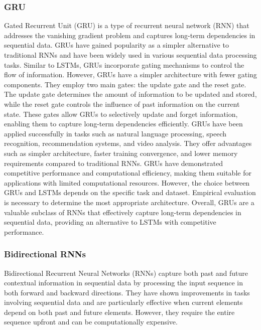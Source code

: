 \subsubsection{GRU}
Gated Recurrent Unit (GRU) is a type of recurrent neural network (RNN) that addresses the vanishing gradient problem and captures long-term dependencies in sequential data. GRUs have gained popularity as a simpler alternative to traditional RNNs and have been widely used in various sequential data processing tasks.
Similar to LSTMs, GRUs incorporate gating mechanisms to control the flow of information. However, GRUs have a simpler architecture with fewer gating components. They employ two main gates: the update gate and the reset gate. The update gate determines the amount of information to be updated and stored, while the reset gate controls the influence of past information on the current state. These gates allow GRUs to selectively update and forget information, enabling them to capture long-term dependencies efficiently.
GRUs have been applied successfully in tasks such as natural language processing, speech recognition, recommendation systems, and video analysis. They offer advantages such as simpler architecture, faster training convergence, and lower memory requirements compared to traditional RNNs. GRUs have demonstrated competitive performance and computational efficiency, making them suitable for applications with limited computational resources.
However, the choice between GRUs and LSTMs depends on the specific task and dataset. Empirical evaluation is necessary to determine the most appropriate architecture. Overall, GRUs are a valuable subclass of RNNs that effectively capture long-term dependencies in sequential data, providing an alternative to LSTMs with competitive performance.
\subsubsection{Bidirectional RNNs}
Bidirectional Recurrent Neural Networks (RNNs) capture both past and future contextual information in sequential data by processing the input sequence in both forward and backward directions. They have shown improvements in tasks involving sequential data and are particularly effective when current elements depend on both past and future elements. However, they require the entire sequence upfront and can be computationally expensive.
